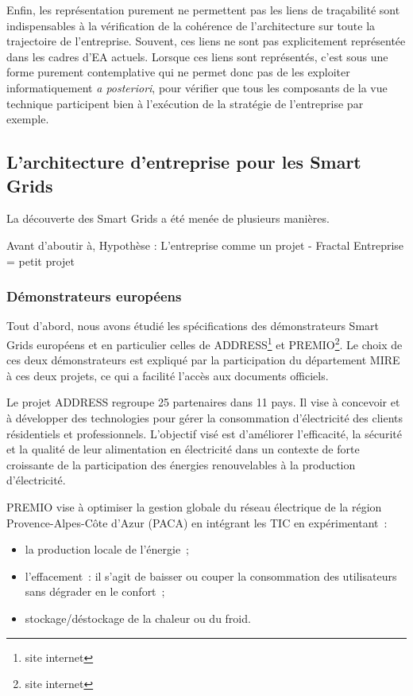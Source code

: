 	Enfin, les représentation purement  ne permettent pas les liens de traçabilité 
sont indispensables à la vérification de la cohérence de l'architecture sur 
toute la trajectoire de l'entreprise. Souvent, ces liens ne sont pas 
explicitement représentée dans les cadres d'EA actuels. Lorsque ces liens sont 
représentés, c'est sous une forme purement contemplative qui ne permet donc pas 
de les exploiter informatiquement \textit{a posteriori}, pour vérifier que tous 
les composants de la vue technique participent bien à l'exécution de la 
stratégie de l'entreprise par exemple. 
	
	\subsection{L'architecture d'entreprise pour les Smart Grids}
	
La découverte des Smart Grids a été menée de plusieurs manières.

Avant d'aboutir à, Hypothèse : L'entreprise comme un projet - Fractal
Entreprise = petit projet
 

\subsubsection{Démonstrateurs européens}

Tout d'abord, nous avons étudié les spécifications des démonstrateurs Smart 
Grids européens et en particulier celles de ADDRESS\footnote{site internet} et 
PREMIO\footnote{site internet}. Le choix de ces deux démonstrateurs est expliqué 
par la participation du département MIRE à ces deux projets, ce qui a facilité 
l'accès aux documents officiels. 

Le projet ADDRESS regroupe 25 partenaires dans 11 pays. Il vise à concevoir et à 
développer des technologies pour gérer la consommation d'électricité des clients 
résidentiels et professionnels. L'objectif visé est d'améliorer l'efficacité, la 
sécurité et la qualité de leur alimentation en électricité dans un contexte de 
forte croissante de la participation des énergies renouvelables à la production 
d'électricité. 

PREMIO vise à optimiser la gestion globale du réseau électrique de la région 
Provence-Alpes-Côte d'Azur (PACA) en intégrant les TIC en expérimentant~:
\begin{itemize}
\item la production locale de l'énergie~;
\item l'effacement~: il s'agit de baisser ou couper la consommation des 
utilisateurs sans dégrader en le confort~;
\item stockage/déstockage de la chaleur ou du froid.
\end{itemize}


